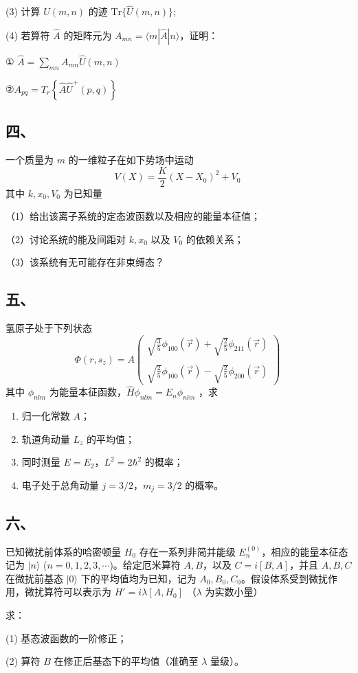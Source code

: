(3) 计算 $\hat{U}(m,n)$ 的迹 $\mathrm{Tr}\{\hat{U}(m,n)\}$;

(4) 若算符 $\hat{A}$ 的矩阵元为 $A_{mn} = \langle m|\hat{A}|n\rangle$，证明：

① $\hat{A} =\sum_{mn} A_{mn} \hat{U}(m,n)$

②$A_{pq} =T_r\left\{\hat{A}\hat{U}^+(p,q)\right\}$
\subsection{四、}
一个质量为 $m$ 的一维粒子在如下势场中运动
$$V(X)=\frac{K}{2}(X-X_0)^2+V_0~$$
其中 $k, x_0, V_0$ 为已知量

（1）给出该离子系统的定态波函数以及相应的能量本征值；

（2）讨论系统的能及间距对 $k,x_0$ 以及 $V_0$ 的依赖关系；

（3）该系统有无可能存在非束缚态？
\subsection{五、}
氢原子处于下列状态
$$\Phi(r, s_z) = A \begin{pmatrix}
\sqrt{\frac{3}{5}} \phi_{100}(\vec{r}) + \sqrt{\frac{2}{5}} \phi_{211}(\vec{r}) \\\\
\sqrt{\frac{2}{5}} \phi_{100}(\vec{r}) - \sqrt{\frac{2}{5}} \phi_{200}(\vec{r})
\end{pmatrix}~
$$
其中 $\phi_{nlm}$ 为能量本征函数，$\hat{H} \phi_{nlm} = E_n \phi_{nlm}$ ，求

\begin{enumerate}
  \item 归一化常数 $A$；
  \item 轨道角动量 $L_z$ 的平均值；
  \item 同时测量 $E = E_2$，$L^2 = 2\hbar^2$ 的概率；
  \item 电子处于总角动量 $j = 3/2$，$m_j = 3/2$ 的概率。
\end{enumerate}
\subsection{六、}
已知微扰前体系的哈密顿量 $H_0$ 存在一系列非简并能级 $E_n^{(0)}$，相应的能量本征态记为 $|n\rangle$ ($n = 0, 1, 2, 3, \cdots$)。给定厄米算符 $A, B$，以及 $C = i[B, A]$，并且 $A, B, C$ 在微扰前基态 $|0\rangle$ 下的平均值均为已知，记为 $A_0, B_0, C_0$。假设体系受到微扰作用，微扰算符可以表示为 $H' = i\lambda[A, H_0]$ （$\lambda$ 为实数小量）

求：

(1) 基态波函数的一阶修正；

(2) 算符 $B$ 在修正后基态下的平均值（准确至 $\lambda$ 量级）。
